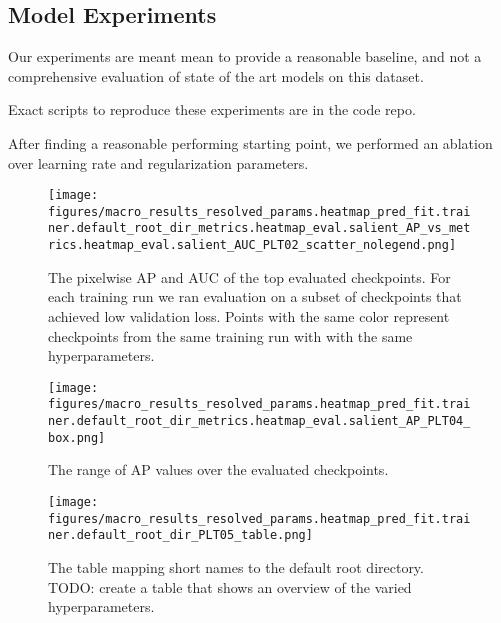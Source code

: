 \documentclass[10pt,twocolumn,letterpaper]{article}
\begin{document}
\subsection{Model Experiments}

\begin{comment}
    SeeAlso:
    ~/code/shitspotter/experiments/run_pixel_eval_pipeline.sh

    python ~/code/shitspotter/dev/poc/estimate_train_resources.py
\end{comment}

Our experiments are meant mean to provide a reasonable baseline, and not a
comprehensive evaluation of state of the art models on this dataset.

Exact scripts to reproduce these experiments are in the code repo.

After finding a reasonable performing starting point, we performed an ablation
over learning rate and regularization parameters. 
\begin{figure}[h]
\centering

\texttt{[image: figures/macro\_results\_resolved\_params.heatmap\_pred\_fit.trainer.default\_root\_dir\_metrics.heatmap\_eval.salient\_AP\_vs\_metrics.heatmap\_eval.salient\_AUC\_PLT02\_scatter\_nolegend.png]}
\caption[]{
    The pixelwise AP and AUC of the top evaluated checkpoints.
    For each training run we ran evaluation on a subset of checkpoints that
    achieved low validation loss.
    Points with the same color represent checkpoints from the same training run
    with with the same hyperparameters.
}
\label{fig:apauc_scatter}
\end{figure}


\begin{figure}[h]
\centering
\texttt{[image: figures/macro\_results\_resolved\_params.heatmap\_pred\_fit.trainer.default\_root\_dir\_metrics.heatmap\_eval.salient\_AP\_PLT04\_box.png]}
\caption{
    The range of AP values over the evaluated checkpoints.
}
\label{fig:ap_boxplot}
\end{figure}


\begin{figure}[h]
\centering
\texttt{[image: figures/macro\_results\_resolved\_params.heatmap\_pred\_fit.trainer.default\_root\_dir\_PLT05\_table.png]}
\caption{
    The table mapping short names to the default root directory.
    TODO: create a table that shows an overview of the varied hyperparameters.
}
\label{fig:scatter_legend}
\end{figure}
\end{document}
